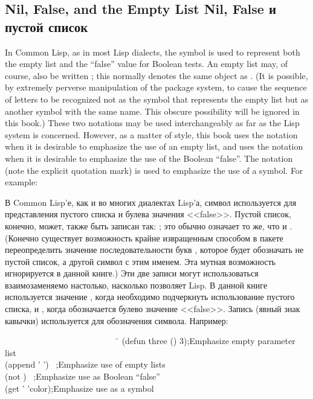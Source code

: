 \subsection{Nil, False, and the Empty List Nil, False и пустой список}

In Common Lisp, as in most Lisp dialects, the symbol 
 is used to represent both the empty list and the ``false'' value
for Boolean tests.  An empty list may, of course, also be written
\cd{()}; this normally denotes the same object as .
(It is possible, by extremely perverse manipulation of the package system,
to cause the sequence of letters  to be recognized
not as the symbol that represents the empty list but as another
symbol with the same name.  This obscure possibility will be ignored
in this book.)
These two notations may be used interchangeably as far as the Lisp
system is concerned.  However, as a matter of style,
this book
uses the notation {\emptylist} when it is desirable to emphasize
the use of an empty list, and uses the notation {\false}
when it is desirable to emphasize the use of the Boolean ``false''.
The notation  (note the explicit quotation mark) is used to emphasize
the use of a symbol.
For example:

В Common Lisp'е, как и во многих диалектах Lisp'а, символ  используется
для представления пустого списка и булева значения <<false>>. Пустой список,
конечно, может, также быть записан так: \cd{()}; это обычно означает то же, что
и .
(Конечно существует возможность крайне извращенным способом в пакете
переопределить значение последовательности букв , которое будет 
обозначать не пустой список, а другой символ с этим именем. Эта мутная
возможность игнорируется в данной книге.)
Эти две записи могут использоваться взаимозаменяемо настолько, насколько
позволяет Lisp. В данной книге используется значение {\emptylist}, когда необходимо
подчеркнуть использование пустого списка, и {\false}, когда обозначается булево
значение <<false>>. Запись  (явный знак кавычки) используется для
обозначения символа.
Например:

\begin{lisp}
~~~~~~~~~~~~~~~~~~~~~~~~~~~\=\kill
(defun three () 3)\>;{\rm Emphasize empty parameter list} \\
(append '{\emptylist} '{\emptylist}) \EV\ {\emptylist}\>;{\rm Emphasize use of empty lists} \\
(not {\false}) \EV\ {\true}\>;{\rm Emphasize use as Boolean ``false''} \\
(get '{\nil} 'color)\>;{\rm Emphasize use as a symbol}
\end{lisp}

